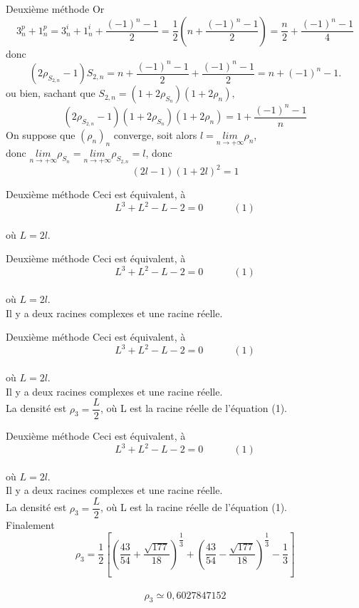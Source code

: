 \documentclass[12pt]{beamer}
\begin{document}
\begin{frame}[t]{Deuxième méthode}
Or $$3_n^p+1_n^p=3_n^i+1_n^i+\frac{(-1)^n-1}{2}=\frac{1}{2}(n+\frac{(-1)^n-1}{2})=\frac{n}{2}+\frac{(-1)^n-1}{4}$$
donc $$(2\rho_S_{2,n}-1)S_{2,n}=n+\frac{(-1)^n-1}{2}+\frac{(-1)^n-1}{2}=n+(-1)^n-1.$$ 
ou bien, sachant que $S_{2,n}=(1+2\rho_{S_n})(1+2\rho_n),$ $$(2\rho_{S_{2,n}}-1)(1+2\rho_{S_n})(1+2\rho_n)=1+\frac{(-1)^n-1}{n}$$
 On suppose que $(\rho_n)_n$ converge, soit alors $l=\underset{n\rightarrow + \infty}{l i m}\rho_n$,\\
 donc 
$\underset{n\rightarrow + \infty}{l i m}\rho_{S_n}=\underset{n\rightarrow + \infty}{l i m}\rho_{S_{2,n}}=l$,
donc $$(2l-1)(1+2l)^2=1$$
\end{frame}
\begin{frame}[t]{Deuxième méthode}
 Ceci est équivalent, à
$$
L^3+L^2-L-2=0 \quad \quad \quad (1)
$$ \\
où $L=2l$.
\end{frame}
\begin{frame}[t]{Deuxième méthode}
 Ceci est équivalent, à
$$
L^3+L^2-L-2=0 \quad \quad \quad (1)
$$ \\
où $L=2l$. \\
Il y a deux racines complexes et une racine réelle.
\end{frame}

\begin{frame}[t]{Deuxième méthode}
 Ceci est équivalent, à
 $$
L^3+L^2-L-2=0 \quad \quad \quad (1)
$$\\
où $L=2l$. \\
Il y a deux racines complexes et une racine réelle. \\ 
La densité est $\rho_3=\dfrac{L}{2}$, où L est la racine réelle de l'équation (1).
\end{frame}

\begin{frame}[t]{Deuxième méthode}
 Ceci est équivalent, à
$$
L^3+L^2-L-2=0 \quad \quad \quad (1)
$$\\
où $L=2l$. \\
Il y a deux racines complexes et une racine réelle. \\ 
La densité est $\rho_3=\dfrac{L}{2}$, où L est la racine réelle de l'équation (1).\\
Finalement 
$$\rho_3=\dfrac{1}{2} 
\left[(\dfrac{43}{54}+\dfrac{\sqrt{177}}{18})^{\dfrac{1}{3}}+(\dfrac{43}{54}-\dfrac{\sqrt{177}}{18})^{\dfrac{1}{3}}-\dfrac{1}{3}\right]$$ \\
$$\rho_3\simeq0,6027847152$$
\end{frame}
\end{document}
